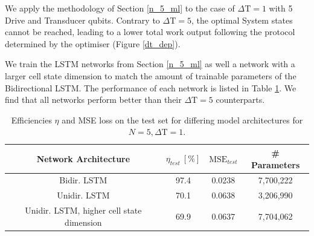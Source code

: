 We apply the methodology of Section \ref{n_5_ml} to the case of $\Delta \mathrm{T} = 1$ with 5 Drive and Transducer qubits.
Contrary to $\Delta \mathrm{T} = 5$, the optimal System states cannot be reached, leading to a lower total work output following the protocol determined by the optimiser (Figure \ref{dt_dep}).

We train the LSTM networks from Section \ref{n_5_ml} as well a network with a larger cell state dimension to match the amount of trainable parameters of the Bidirectional LSTM.
The performance of each network is listed in Table \ref{effdt1}.
We find that all networks perform better than their $\Delta \mathrm{T} = 5$ counterparts.

\begin{table}[h]
	\centering
	\begin{tabular}{ c | c | c | c }
		Network Architecture & $\eta_{test} \ [\%]$ & $\mathrm{MSE}_{test}$  & \# Parameters \\
		\hline
		Bidir. LSTM & 97.4 & 0.0238 & 7,700,222 \\
		Unidir. LSTM & 70.1 & 0.0638 & 3,206,990 \\
		Unidir. LSTM, higher cell state dimension & 69.9 & 0.0637 & 7,704,062 \\
	\end{tabular}
	\caption{Efficiencies $\eta$ and MSE loss on the test set for differing model architectures for $N=5, \Delta \mathrm{T} = 1$.}
	\label{effdt1}
\end{table}


